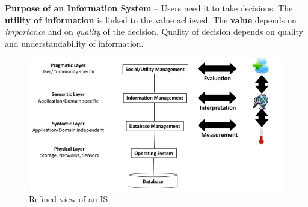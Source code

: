 \textbf{Purpose of an Information System} -- Users need it to take decisions. The \textbf{utility of information} is linked to the value achieved. The \textbf{value} depends on \emph{importance} and on \emph{quality} of the decision. Quality of decision depends on quality and understandability of information.

    \begin{figure}[htp]
      \centering
        \includegraphics[width=\textwidth]{images/infosysagain.png}
        \caption{Refined view of an IS}
        \label{fig:infosysagain}
    \end{figure}